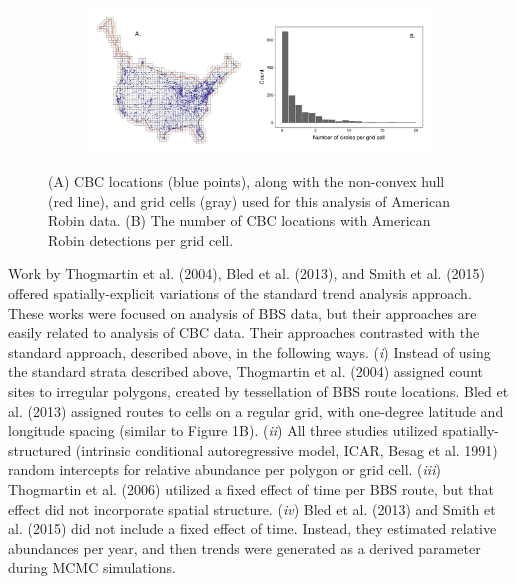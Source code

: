 \documentclass[]{article}
\begin{document}
\begin{figure}[t]
  \centering
    \begin{subfigure}[t]{0.93\textwidth}
    \centering
    \includegraphics[width=\textwidth]{gridding} 
  \end{subfigure}
    \caption{(A) CBC locations (blue points), along with the non-convex hull (red line), and grid cells (gray) used for this analysis of American Robin data. (B) The number of CBC locations with American Robin detections per grid cell.}
\end{figure}

Work by Thogmartin et al. (2004), Bled et al. (2013), and Smith et al. (2015) offered spatially-explicit variations of the standard trend analysis approach. These works were focused on analysis of BBS data, but their approaches are easily related to analysis of CBC data. Their approaches contrasted with the standard approach, described above, in the following ways. (\textit{i}) Instead of using the standard strata described above, Thogmartin et al. (2004) assigned count sites to irregular polygons, created by tessellation of BBS route locations.  Bled et al. (2013) assigned routes to cells on a regular grid, with one-degree latitude and longitude spacing (similar to Figure 1B). (\textit{ii}) All three studies utilized spatially-structured (intrinsic conditional autoregressive model, ICAR, Besag et al. 1991) random intercepts for relative abundance per polygon or grid cell. (\textit{iii}) Thogmartin et al. (2006) utilized a fixed effect of time per BBS route, but that effect did not incorporate spatial structure. (\textit{iv}) Bled et al. (2013) and Smith et al. (2015) did not include a fixed effect of time. Instead, they estimated relative abundances per year, and then trends were generated as a derived parameter during MCMC simulations.
\end{document}
